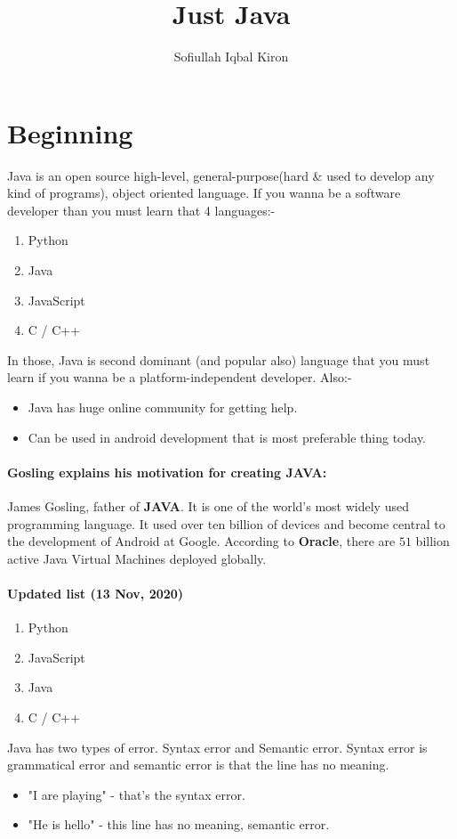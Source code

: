 \documentclass[10 pt]{article}
\title{Just Java}
\author{Sofiullah Iqbal Kiron}
\newcommand{\I}{\item}
\begin{document}
\maketitle
\justify

\section{Beginning}
Java is an open source high-level, general-purpose(hard \& used to develop any kind of programs), object oriented language. If you wanna be a software developer than you must learn that 4 languages:-

\begin{enumerate}
	\I Python
	\I Java
	\I JavaScript
	\I C / C++
\end{enumerate}

In those, Java is second dominant (and popular also) language that you must learn if you wanna be a platform-independent developer. Also:-
\begin{itemize}
	\I[$\rightarrow$] Java has huge online community for getting help.
	\I[$\rightarrow$] Can be used in android development that is most preferable thing today.
\end{itemize}

\paragraph{Gosling explains his motivation for creating \textbf{JAVA}:}
James Gosling, father of \textbf{JAVA}. It is one of the world's most widely used programming language. It used over ten billion of devices and become central to the development of Android at Google. According to \textbf{Oracle}, there are $51$ billion active Java Virtual Machines deployed globally.

\paragraph{Updated list (13 Nov, 2020)}
\begin{enumerate}
	\I Python
	\I JavaScript
	\I Java
	\I C / C++
\end{enumerate}

Java has two types of error. Syntax error and Semantic error. Syntax error is grammatical error and semantic error is that the line has no meaning.
\begin{itemize}
	\I[$\rightarrow$] "I are playing" - that's the syntax error.
	\I[$\rightarrow$] "He is hello" - this line has no meaning, semantic error.
\end{itemize}
\end{document}
